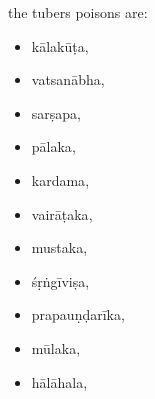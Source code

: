 \begin{translation}

        \item
        the tubers poisons are:
        \begin{itemize}
             \item \gls{kālakūṭa},
\item \gls{vatsanābha},
\item \gls{sarṣapa},
\item \gls{pālaka},
\item \gls{kardama},
\item \gls{vairāṭaka},
\item \gls{mustaka},
\item \gls{śṛṅgīviṣa},
\item \gls{prapauṇḍarīka},
\item \gls{mūlaka},
\item \gls{hālāhala},

\end{itemize}
\end{translation}
